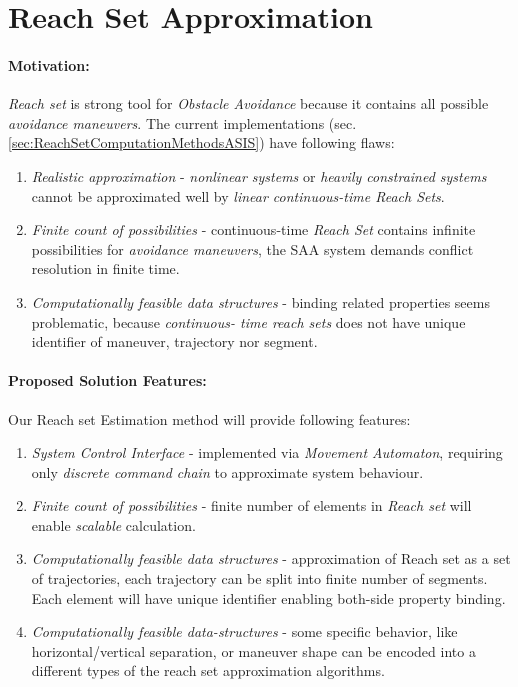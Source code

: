 \cleardoublepage
\section{Reach Set Approximation}\label{s:reachSet}

    \noindent\paragraph{Motivation:} \emph{Reach set} is strong tool for \emph{Obstacle Avoidance} because it contains all possible \emph{avoidance maneuvers}. The current implementations (sec. \ref{sec:ReachSetComputationMethodsASIS}) have following flaws:
    
    \begin{enumerate}
        \item \emph{Realistic approximation} - \emph{nonlinear systems} or \emph{heavily constrained systems} cannot be approximated well by \emph{linear continuous-time Reach Sets}.
        
        \item \emph{Finite count of possibilities} - continuous-time \emph{Reach Set} contains  infinite possibilities for \emph{avoidance maneuvers}, the SAA system demands conflict resolution in finite time.
        
        \item \emph{Computationally feasible data structures} - binding related properties seems problematic, because \emph{continuous- time reach sets} does not have unique identifier of maneuver, trajectory nor segment. 
    \end{enumerate}
    
    \paragraph{Proposed Solution Features:} Our Reach set Estimation method will provide following features:
    
    \begin{enumerate}
        \item \emph{System Control Interface} - implemented via \emph{Movement Automaton}, requiring only \emph{discrete command chain} to approximate system behaviour.
        
        \item \emph{Finite count of possibilities} - finite number of elements in \emph{Reach set} will enable \emph{scalable} calculation.
        
        \item \emph{Computationally feasible data structures} - approximation of Reach set as a set of trajectories, each trajectory can be split into finite number of segments. Each element will have unique identifier enabling both-side  property binding.
        
        \item \emph{Computationally feasible data-structures} - some specific behavior, like horizontal/vertical separation, or maneuver shape can be encoded into a different types of the reach set approximation algorithms.
    \end{enumerate}